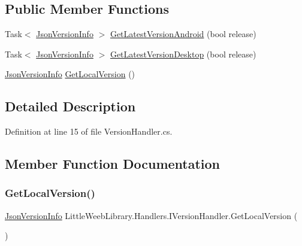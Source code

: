 \subsection*{Public Member Functions}
\begin{DoxyCompactItemize}
\item 
Task$<$ \mbox{\hyperlink{class_little_weeb_library_1_1_models_1_1_json_version_info}{Json\+Version\+Info}} $>$ \mbox{\hyperlink{interface_little_weeb_library_1_1_handlers_1_1_i_version_handler_a812c819dce905da83c29a48e3aabba2e}{Get\+Latest\+Version\+Android}} (bool release)
\item 
Task$<$ \mbox{\hyperlink{class_little_weeb_library_1_1_models_1_1_json_version_info}{Json\+Version\+Info}} $>$ \mbox{\hyperlink{interface_little_weeb_library_1_1_handlers_1_1_i_version_handler_a0d72fd0650a8bd465bcf22fab766e111}{Get\+Latest\+Version\+Desktop}} (bool release)
\item 
\mbox{\hyperlink{class_little_weeb_library_1_1_models_1_1_json_version_info}{Json\+Version\+Info}} \mbox{\hyperlink{interface_little_weeb_library_1_1_handlers_1_1_i_version_handler_a0358d04d17b2333448008eb793add5ae}{Get\+Local\+Version}} ()
\end{DoxyCompactItemize}


\subsection{Detailed Description}


Definition at line 15 of file Version\+Handler.\+cs.



\subsection{Member Function Documentation}
\mbox{\label{interface_little_weeb_library_1_1_handlers_1_1_i_version_handler_a0358d04d17b2333448008eb793add5ae}} 
\subsubsection{\texorpdfstring{Get\+Local\+Version()}{GetLocalVersion()}}
{\footnotesize\ttfamily \mbox{\hyperlink{class_little_weeb_library_1_1_models_1_1_json_version_info}{Json\+Version\+Info}} Little\+Weeb\+Library.\+Handlers.\+I\+Version\+Handler.\+Get\+Local\+Version (\begin{DoxyParamCaption}{ }\end{DoxyParamCaption})}



